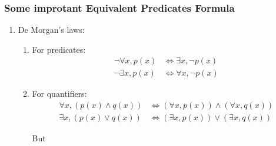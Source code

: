 \subsubsection{Some improtant Equivalent Predicates Formula}
\begin{enumerate}
    \item De Morgan's laws:
    \begin{enumerate}
        \item For predicates:
        \begin{align*}
            \neg \forall x, p(x) &\Longleftrightarrow \exists x, \neg p(x)\\
            \neg \exists x, p(x) &\Longleftrightarrow \forall x, \neg p(x)
        \end{align*}
        \item For quantifiers:
        \begin{align*}
            \forall x, (p(x)\land q(x)) &\Longleftrightarrow (\forall x, p(x)) \land (\forall x, q(x))\\
            \exists x, (p(x)\lor q(x)) &\Longleftrightarrow (\exists x, p(x)) \lor (\exists x, q(x))
        \end{align*}

        But


\end{enumerate}
\end{enumerate}

